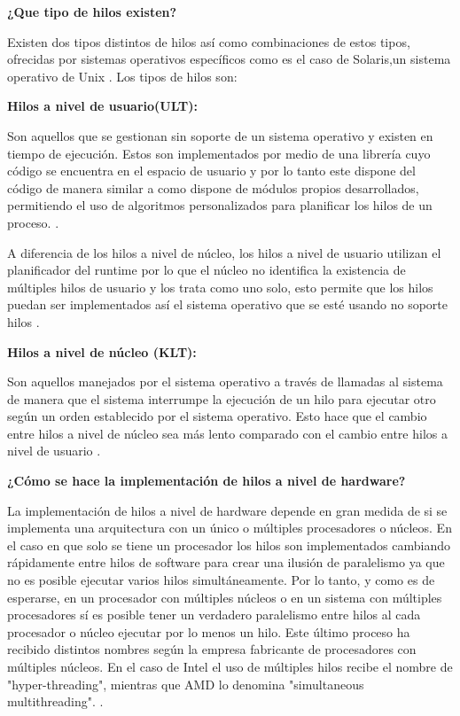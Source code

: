 \documentclass[a4paper,11pt]{article}
\begin{document}
{\large\bfseries ¿Que tipo de hilos existen? }

Existen dos tipos distintos de hilos así como combinaciones de estos tipos, ofrecidas por sistemas operativos específicos como es el caso de Solaris,un sistema operativo de Unix \cite[p.192]{stallings2009operating}.
Los tipos de hilos son:

{\large\bfseries Hilos a nivel de usuario(ULT): } 

Son aquellos que se gestionan sin soporte de un sistema operativo y existen en tiempo de ejecución. Estos son implementados por medio de una librería cuyo código se encuentra en el espacio de usuario y por lo tanto este dispone del código de manera similar a como dispone de módulos propios desarrollados, permitiendo el uso de algoritmos personalizados para planificar los hilos de un proceso. \cite{candela2007fundamentos}\cite{shibu2009introduction}.

A diferencia de los hilos a nivel de núcleo, los hilos a nivel de usuario utilizan el planificador del runtime por lo que el núcleo no identifica la existencia de múltiples hilos de usuario y los trata como uno solo, esto permite que los hilos puedan ser implementados así el sistema operativo que se esté usando no soporte hilos \cite{silva2015sistemas}.

{\large\bfseries Hilos a nivel de núcleo (KLT):}

Son aquellos manejados por el sistema operativo a través de llamadas al sistema \cite{candela2007fundamentos} de manera que el sistema interrumpe la ejecución de un hilo para ejecutar otro según un orden establecido por el sistema operativo. Esto hace que el cambio entre hilos a nivel de núcleo sea más lento comparado con el cambio entre hilos a nivel de usuario \cite[p.401]{silva2015sistemas}. 

{\large\bfseries ¿Cómo se hace la implementación de hilos a nivel de hardware? } 

La implementación de hilos a nivel de hardware depende en gran medida de si se implementa una arquitectura con un único o múltiples procesadores o núcleos.
En el caso en que solo se tiene un procesador  los hilos son implementados cambiando rápidamente entre hilos de software para crear una ilusión de paralelismo ya que no es posible ejecutar varios hilos simultáneamente.
Por lo tanto, y como es de esperarse, en un procesador con múltiples núcleos o en un sistema con múltiples procesadores sí es posible tener un verdadero paralelismo entre hilos al cada procesador o núcleo ejecutar por lo menos un hilo.
Este último proceso ha recibido distintos nombres según la empresa fabricante de procesadores con múltiples núcleos. En el caso de Intel el uso de múltiples hilos recibe el nombre de "hyper-threading", mientras que AMD lo denomina "simultaneous multithreading". \cite[p.402]{shibu2009introduction}.
\end{document}
